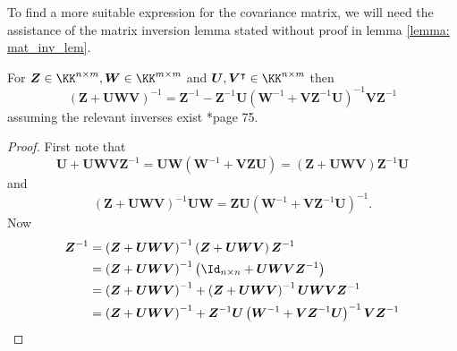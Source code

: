 To find a more suitable expression for the covariance matrix, we will need the assistance of the matrix inversion lemma stated without proof in lemma \ref{lemma: mat_inv_lem}.
\begin{lem} \label{lemma: mat_inv_lem}
    For $\bm{Z} \in \KK^{n \times m}, \bm{W} \in \KK^{m \times m}$ and $\bm{U},\bm{V}^{\intercal} \in \KK^{n \times m}$ then
    \[
        \left( \bm{Z} + \bm{U} \bm{W} \bm{V} \right)^{-1} = \bm{Z}^{-1} - \bm{Z}^{-1} \bm{U} \left( \bm{W}^{-1} + \bm{V} \bm{Z}^{-1} \bm{U} \right)^{-1} \bm{V} \bm{Z}^{-1}
    \]
    assuming the relevant inverses exist \cite{PressWilliamH.WilliamHenry1992NriC}*{page 75}.
\end{lem}

\begin{proof}
    First note that
    \[
        \bm{U} + \bm{U} \bm{W} \bm{V} \bm{Z}^{-1} = \bm{U} \bm{W} \left( \bm{W}^{-1} + \bm{V} \bm{Z} \bm{U} \right) = \left( \bm{Z} + \bm{U} \bm{W} \bm{V} \right) \bm{Z}^{-1} \bm{U}
    \]
    and
    \[
        \left( \bm{Z} + \bm{U} \bm{W} \bm{V} \right)^{-1} \bm{U} \bm{W} = \bm{Z} \bm{U} \left( \bm{W}^{-1} + \bm{V} \bm{Z}^{-1} \bm{U} \right)^{-1}.
    \]
    Now
    \begin{align*}
        \bm{Z}^{-1} & = \left( \bm{Z} + \bm{U} \bm{W} \bm{V} \right)^{-1} \left( \bm{Z} + \bm{U} \bm{W} \bm{V} \right) \bm{Z}^{-1}                                            \\
                    & = \left( \bm{Z} + \bm{U} \bm{W} \bm{V} \right)^{-1} \left( \Id_{n \times n} + \bm{U} \bm{W} \bm{V} \bm{Z}^{-1} \right)                                  \\
                    & = \left( \bm{Z} + \bm{U} \bm{W} \bm{V} \right)^{-1} + \left( \bm{Z} + \bm{U} \bm{W} \bm{V} \right)^{-1} \bm{U} \bm{W} \bm{V} \bm{Z}^{-1}                \\
                    & = \left( \bm{Z} + \bm{U} \bm{W} \bm{V} \right)^{-1} + \bm{Z}^{-1} \bm{U} \left( \bm{W}^{-1} + \bm{V} \bm{Z}^{-1} \bm{U} \right)^{-1} \bm{V} \bm{Z}^{-1} \\
    \end{align*}
\end{proof}

